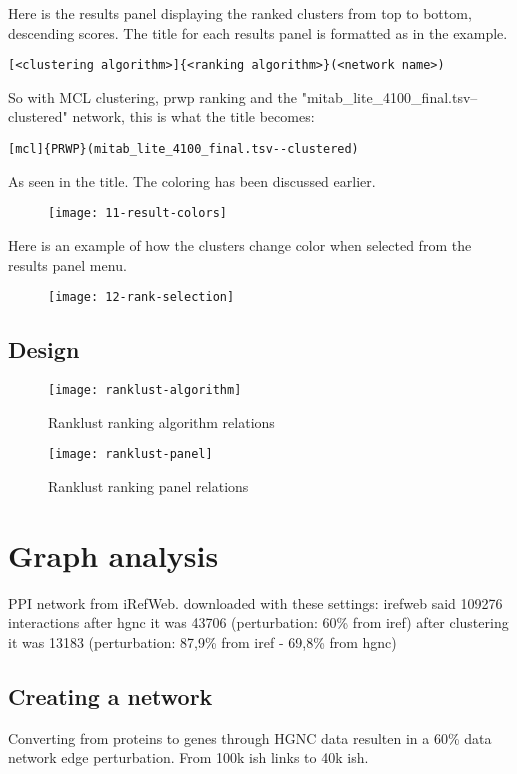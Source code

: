 Here is the results panel displaying the ranked clusters from top to bottom,
descending scores. The title for each results panel is formatted as in the
example.
\begin{verbatim}
[<clustering algorithm>]{<ranking algorithm>}(<network name>)
\end{verbatim}
So with MCL clustering, \gls{prwp} ranking and the
"mitab\_lite\_4100\_final.tsv--clustered" network, this is what the title
becomes:
\begin{verbatim}
[mcl]{PRWP}(mitab_lite_4100_final.tsv--clustered)
\end{verbatim}
As seen in the title. The coloring has been discussed earlier.
\begin{figure}[H]
    \label{fig:}
    \texttt{[image: 11-result-colors]}
\end{figure}

Here is an example of how the clusters change color when selected from the
results panel menu.
\begin{figure}[H]
    \label{fig:}
    \texttt{[image: 12-rank-selection]}
\end{figure}

\section{Design}
\begin{figure}[H]
    \caption{Ranklust ranking algorithm relations}
    \label{fig:rank-alg}
    \texttt{[image: ranklust-algorithm]}
\end{figure}
\begin{figure}[H]
    \caption{Ranklust ranking panel relations}
    \label{fig:rank-panel}
    \texttt{[image: ranklust-panel]}
\end{figure}

\chapter{Graph analysis}
PPI network from iRefWeb.
downloaded with these settings: %
irefweb said 109276 interactions 
after hgnc it was 43706 (perturbation: 60\% from iref)
after clustering it was 13183 (perturbation: 87,9\% from iref - 69,8\% from hgnc) %

\section{Creating a network}
Converting from proteins to genes through HGNC data resulten in a 60\% data
network edge perturbation. From 100k ish links to 40k ish.

